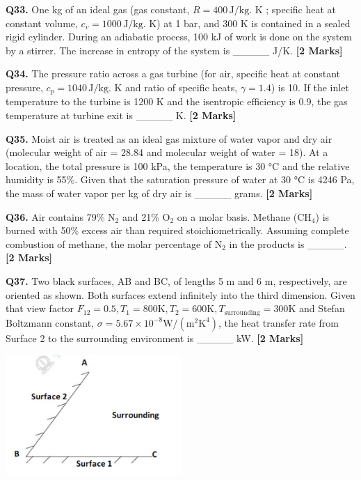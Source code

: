 \documentclass[11pt]{article}
\newcommand{\questionb}[2]{
    \noindent\textbf{Q#2.} #1 \hfill \textbf{[2 Marks]}
}
\begin{document}
\questionb{One kg of an ideal gas (gas constant, \( R = 400 \, \text{J/kg} \). K ; specific heat at constant volume, \( c_v = 1000 \, \text{J/kg} \). K) at 1 bar, and 300 K is contained in a sealed rigid cylinder. During an adiabatic process, 100 kJ of work is done on the system by a stirrer. The increase in entropy of the system is \_\_\_\_\_ J/K.}{33}
\vspace{0.5cm}

\questionb{The pressure ratio across a gas turbine (for air, specific heat at constant pressure, \( c_p = 1040 \, \text{J/kg} \). K and ratio of specific heats, \( \gamma = 1.4 \)) is 10. If the inlet temperature to the turbine is 1200 K and the isentropic efficiency is 0.9, the gas temperature at turbine exit is \_\_\_\_\_ K.}{34}
\vspace{0.5cm}

\questionb{Moist air is treated as an ideal gas mixture of water vapor and dry air (molecular weight of air = 28.84 and molecular weight of water = 18). At a location, the total pressure is 100 kPa, the temperature is 30 °C and the relative humidity is 55\%. Given that the saturation pressure of water at 30 °C is 4246 Pa, the mass of water vapor per kg of dry air is \_\_\_\_\_ grams.}{35}
\vspace{0.5cm}

\questionb{Air contains 79\% \( \text{N}_2 \) and 21\% \( \text{O}_2 \) on a molar basis. Methane (CH\(_4\)) is burned with 50\% excess air than required stoichiometrically. Assuming complete combustion of methane, the molar percentage of \( \text{N}_2 \) in the products is \_\_\_\_\_.}{36}
\vspace{0.5cm}

\questionb{Two black surfaces, AB and BC, of lengths 5 m and 6 m, respectively, are oriented as shown. Both surfaces extend infinitely into the third dimension. Given that view factor \( F_{12} = 0.5, T_1 = 800\text{K}, T_2 = 600\text{K}, T_{\text{surrounding}} = 300\text{K} \) and Stefan Boltzmann constant, \( \sigma = 5.67 \times 10^{-8}\text{W}/(\text{m}^2\text{K}^4) \), the heat transfer rate from Surface 2 to the surrounding environment is \_\_\_\_\_ kW.}{37}
\begin{center}
\includegraphics[width=0.5\textwidth]{figures/37.png}
\end{center}
\vspace{0.5cm}
\end{document}

